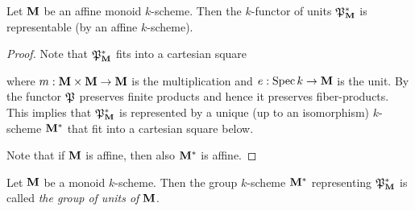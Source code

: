 \begin{proposition}
Let $\mathbf{M}$ be an affine monoid $k$-scheme. Then the $k$-functor of units ${\mathfrak P}_{\mathbf{M}}^*$ is representable (by an affine $k$-scheme).
\end{proposition}
\begin{proof}
Note that ${\mathfrak P}_{\mathbf{M}}^*$ fits into a cartesian square
\begin{center}
\end{center}
where $m:\mathbf{M}\times \mathbf{M}\rightarrow \mathbf{M}$ is the multiplication and $e:\mathrm{Spec}\, k\rightarrow \mathbf{M}$ is the unit. By {\cite[Fact 4.1]{kfunctors}} the functor ${\mathfrak P}$ preserves finite products and hence it preserves fiber-products. This implies that ${\mathfrak P}_{\mathbf{M}}^*$ is represented by a unique (up to an isomorphism) $k$-scheme $\mathbf{M}^*$ that fit into a cartesian square below.
\begin{center}
\end{center}
Note that if $\mathbf{M}$ is affine, then also $\mathbf{M}^*$ is affine.
\end{proof}

\begin{definition}
Let $\mathbf{M}$ be a monoid $k$-scheme. Then the group $k$-scheme $\mathbf{M}^*$ representing ${\mathfrak P}_{\mathbf{M}}^*$ is called \textit{the group of units of $\mathbf{M}$}.
\end{definition}

